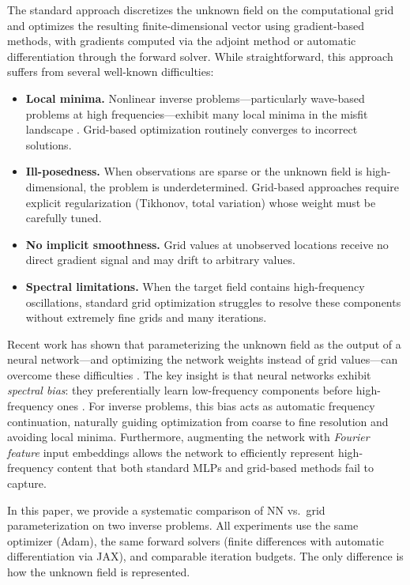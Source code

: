\documentclass[11pt]{article}
\begin{document}
The standard approach discretizes the unknown field on the computational grid and optimizes the resulting finite-dimensional vector using gradient-based methods, with gradients computed via the adjoint method or automatic differentiation through the forward solver. While straightforward, this approach suffers from several well-known difficulties:
\begin{itemize}
  \item \textbf{Local minima.} Nonlinear inverse problems---particularly wave-based problems at high frequencies---exhibit many local minima in the misfit landscape \citep{virieux2009overview}. Grid-based optimization routinely converges to incorrect solutions.
  \item \textbf{Ill-posedness.} When observations are sparse or the unknown field is high-dimensional, the problem is underdetermined. Grid-based approaches require explicit regularization (Tikhonov, total variation) whose weight must be carefully tuned.
  \item \textbf{No implicit smoothness.} Grid values at unobserved locations receive no direct gradient signal and may drift to arbitrary values.
  \item \textbf{Spectral limitations.} When the target field contains high-frequency oscillations, standard grid optimization struggles to resolve these components without extremely fine grids and many iterations.
\end{itemize}

Recent work has shown that parameterizing the unknown field as the output of a neural network---and optimizing the network weights instead of grid values---can overcome these difficulties \citep{sun2023ifwi, zhu2022nnfwi}. The key insight is that neural networks exhibit \emph{spectral bias}: they preferentially learn low-frequency components before high-frequency ones \citep{rahaman2019spectral}. For inverse problems, this bias acts as automatic frequency continuation, naturally guiding optimization from coarse to fine resolution and avoiding local minima. Furthermore, augmenting the network with \emph{Fourier feature} input embeddings \citep{tancik2020fourier} allows the network to efficiently represent high-frequency content that both standard MLPs and grid-based methods fail to capture.

In this paper, we provide a systematic comparison of NN vs.\ grid parameterization on two inverse problems. All experiments use the same optimizer (Adam), the same forward solvers (finite differences with automatic differentiation via JAX), and comparable iteration budgets. The only difference is how the unknown field is represented.
\end{document}
